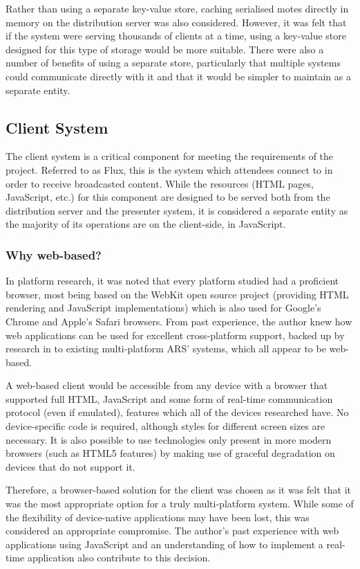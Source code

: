 \documentclass[a4papert,11pt,notitlepage]{ltxdoc}
\begin{document}
Rather than using a separate key-value store, caching serialised motes directly in memory on the distribution server was also considered. However, it was felt that if the system were serving thousands of clients at a time, using a key-value store designed for this type of storage would be more suitable. There were also a number of benefits of using a separate store, particularly that multiple systems could communicate directly with it and that it would be simpler to maintain as a separate entity.

\subsection{Client System}
The client system is a critical component for meeting the requirements of the project. Referred to as Flux, this is the system which attendees connect to in order to receive broadcasted content.
While the resources (HTML pages, JavaScript, etc.) for this component are designed to be served both from the distribution server and the presenter system, it is considered a separate entity as the majority of its operations are on the client-side, in JavaScript.

\subsubsection{Why web-based?}
In platform research, it was noted that every platform studied had a proficient browser, most being based on the WebKit\cite{webkit:web} open source project (providing HTML rendering and JavaScript implementations) which is also used for Google's Chrome and Apple's Safari browsers. From past experience, the author knew how web applications can be used for excellent cross-platform support, backed up by research in to existing multi-platform ARS' systems, which all appear to be web-based. 

A web-based client would be accessible from any device with a browser that supported full HTML, JavaScript and some form of real-time communication protocol (even if emulated), features which all of the devices researched have. No device-specific code is required, although styles for different screen sizes are necessary. It is also possible to use technologies only present in more modern browsers (such as HTML5 features) by making use of graceful degradation on devices that do not support it.

Therefore, a browser-based solution for the client was chosen as it was felt that it was the most appropriate option for a truly multi-platform system. While some of the flexibility of device-native applications may have been lost, this was considered an appropriate compromise. The author's past experience with web applications using JavaScript and an understanding of how to implement a real-time application also contribute to this decision.
\end{document}
